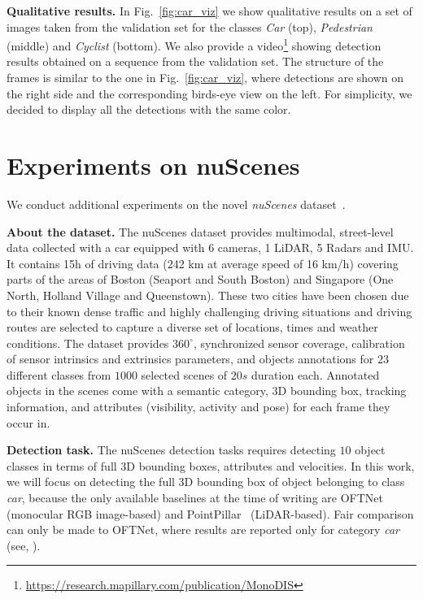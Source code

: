 \documentclass[10pt,twocolumn,letterpaper]{article}
\renewcommand{\paragraph}[1]{

        \vspace{3pt}
	\noindent\textbf{#1}}
\begin{document}
\paragraph{Qualitative results.} In Fig.~\ref{fig:car_viz} we show qualitative results on a set of images taken from the validation set for the classes \textit{Car} (top), \textit{Pedestrian} (middle) and \textit{Cyclist} (bottom).
We also provide a video\footnote{\url{https://research.mapillary.com/publication/MonoDIS}} showing detection results obtained on a sequence from the validation set. The structure of the frames is similar to the one in Fig.~\ref{fig:car_viz}, where detections are shown on the right side and the corresponding birds-eye view on the left. For simplicity, we decided to display all the detections with the same color.  









\section{Experiments on nuScenes}

We conduct additional experiments on the novel \textit{nuScenes} dataset~\cite{Cae+19}.

\paragraph{About the dataset.}
The nuScenes dataset provides multimodal, street-level data collected with a car equipped with 6 cameras, 1 LiDAR, 5 Radars and IMU. It contains 15h of driving data (242 km at average speed of 16 km/h) covering parts of the areas of Boston (Seaport and South Boston) and Singapore (One North, Holland Village and Queenstown). These two cities have been chosen due to their known dense traffic and highly challenging driving situations and driving routes are selected to capture a diverse set of locations, times and weather conditions.
The dataset provides $360^\circ$, synchronized sensor coverage, calibration of sensor intrinsics and extrinsics parameters, and objects annotations for $23$ different classes from $1000$ selected scenes of $20s$ duration each. Annotated objects in the scenes come with a semantic category, 3D bounding box, tracking information, and attributes (visibility, activity and pose) for each frame they occur in.

\paragraph{Detection task.}
The nuScenes detection tasks requires detecting $10$ object classes in terms of full 3D bounding boxes, attributes and velocities. 
In this work, we will focus on detecting the full 3D bounding box of object belonging to class \emph{car}, because the only available baselines at the time of writing are OFTNet (monocular RGB image-based) and PointPillar~\cite{Lang_CVPR_2019} (LiDAR-based). Fair comparison can only be made to OFTNet, where results are reported only for category \textit{car} (see, \cite{Cae+19}).
\end{document}
